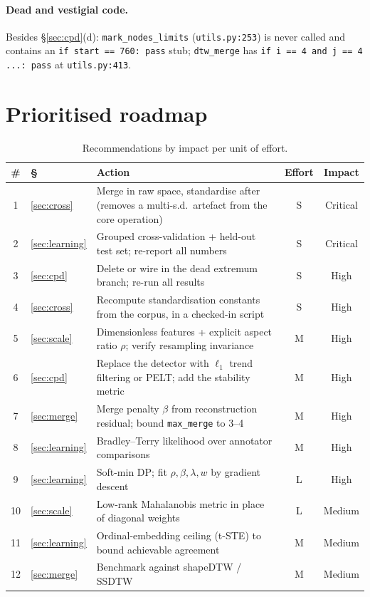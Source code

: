 \documentclass[11pt]{article}
\newcommand{\code}[1]{\texttt{\small #1}}
\begin{document}
\paragraph{Dead and vestigial code.} Besides \S\ref{sec:cpd}(d): \code{mark\_nodes\_limits}
(\code{utils.py:253}) is never called and contains an \code{if start == 760: pass} stub;
\code{dtw\_merge} has \code{if i == 4 and j == 4 ...: pass} at \code{utils.py:413}.

\section{Prioritised roadmap}
\label{sec:roadmap}

\begin{table}[H]
\centering\small
\caption{Recommendations by impact per unit of effort.}
\begin{tabularx}{\textwidth}{clXcc}
\toprule
\# & \S & Action & Effort & Impact \\
\midrule
1 & \ref{sec:cross} & Merge in raw space, standardise after (removes a multi-s.d.\ artefact from the core operation) & S & Critical \\
2 & \ref{sec:learning} & Grouped cross-validation + held-out test set; re-report all numbers & S & Critical \\
3 & \ref{sec:cpd} & Delete or wire in the dead extremum branch; re-run all results & S & High \\
4 & \ref{sec:cross} & Recompute standardisation constants from the corpus, in a checked-in script & S & High \\
5 & \ref{sec:scale} & Dimensionless features + explicit aspect ratio $\rho$; verify resampling invariance & M & High \\
6 & \ref{sec:cpd} & Replace the detector with $\ell_1$ trend filtering or PELT; add the stability metric & M & High \\
7 & \ref{sec:merge} & Merge penalty $\beta$ from reconstruction residual; bound \code{max\_merge} to 3--4 & M & High \\
8 & \ref{sec:learning} & Bradley--Terry likelihood over annotator comparisons & M & High \\
9 & \ref{sec:learning} & Soft-min DP; fit $\rho,\beta,\lambda,w$ by gradient descent & L & High \\
10& \ref{sec:scale} & Low-rank Mahalanobis metric in place of diagonal weights & L & Medium \\
11& \ref{sec:learning} & Ordinal-embedding ceiling (t-STE) to bound achievable agreement & M & Medium \\
12& \ref{sec:merge} & Benchmark against shapeDTW / SSDTW & M & Medium \\
\bottomrule
\end{tabularx}
\end{table}
\end{document}
